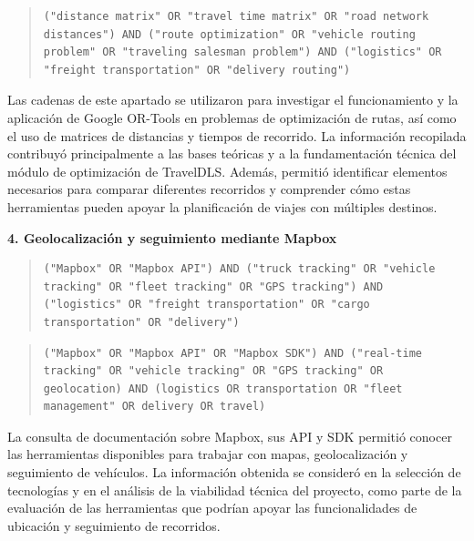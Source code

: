 \begin{quote}
	\begin{lstlisting}[style=cadenas]
		("distance matrix" OR "travel time matrix" OR "road network distances") AND ("route optimization" OR "vehicle routing problem" OR "traveling salesman problem") AND ("logistics" OR "freight transportation" OR "delivery routing")
	\end{lstlisting}
\end{quote}

Las cadenas de este apartado se utilizaron para investigar el funcionamiento y la aplicación de Google OR-Tools en problemas de optimización de rutas, así como el uso de matrices de distancias y tiempos de recorrido. La información recopilada contribuyó principalmente a las bases teóricas y a la fundamentación técnica del módulo de optimización de TravelDLS. Además, permitió identificar elementos necesarios para comparar diferentes recorridos y comprender cómo estas herramientas pueden apoyar la planificación de viajes con múltiples destinos.

\textbf{4. Geolocalización y seguimiento mediante Mapbox}

\begin{quote}
	\begin{lstlisting}[style=cadenas]
		("Mapbox" OR "Mapbox API") AND ("truck tracking" OR "vehicle tracking" OR "fleet tracking" OR "GPS tracking") AND ("logistics" OR "freight transportation" OR "cargo transportation" OR "delivery")
	\end{lstlisting}
\end{quote}

\begin{quote}
	\begin{lstlisting}[style=cadenas]
		("Mapbox" OR "Mapbox API" OR "Mapbox SDK") AND ("real-time tracking" OR "vehicle tracking" OR "GPS tracking" OR geolocation) AND (logistics OR transportation OR "fleet management" OR delivery OR travel)
	\end{lstlisting}
\end{quote}

La consulta de documentación sobre Mapbox, sus API y SDK permitió conocer las herramientas disponibles para trabajar con mapas, geolocalización y seguimiento de vehículos. La información obtenida se consideró en la selección de tecnologías y en el análisis de la viabilidad técnica del proyecto, como parte de la evaluación de las herramientas que podrían apoyar las funcionalidades de ubicación y seguimiento de recorridos.

